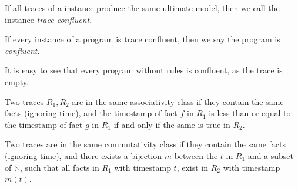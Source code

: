 %


\begin{definition}
%
If all traces of a \lang instance produce the same ultimate model, then we call
the instance {\em trace confluent}.
%
\end{definition}

\begin{definition}
%
If every instance of a program is trace confluent, then we say the program is
{\em confluent}.
%
\end{definition}

\noindent{}It is easy to see that every \lang program without 
rules is confluent, as the trace is empty.

\begin{definition}
%
Two traces $R_1, R_2$ are in the same associativity class if they contain the
same facts (ignoring time), and the timestamp of fact $f$ in $R_1$ is less than
or equal to the timestamp of fact $g$ in $R_1$ if and only if the same is true
in $R_2$.
%
\end{definition}

\begin{definition}
%
Two traces are in the same commutativity class if they contain the same facts
(ignoring time), and there exists a bijection $m$ between the $t$ in $R_1$ and a
subset of $\mathbb{N}$, such that all facts in $R_1$ with timestamp $t$, exist in $R_2$ with timestamp $m(t)$.
%
\end{definition}

